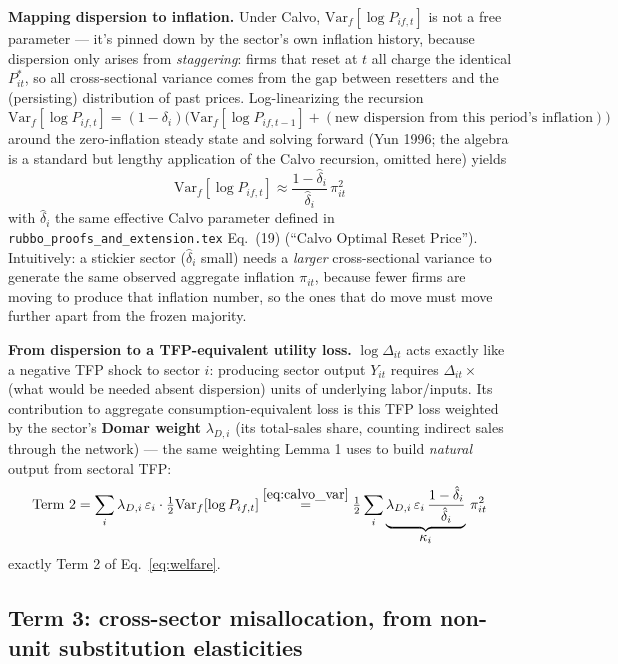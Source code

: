 \documentclass[12pt]{article}
\begin{document}
\textbf{Mapping dispersion to inflation.} Under Calvo, $\mathrm{Var}_f[\log P_{if,t}]$ is not a free
parameter — it's pinned down by the sector's own inflation history, because dispersion only arises
from \emph{staggering}: firms that reset at $t$ all charge the identical $P_{it}^*$, so all
cross-sectional variance comes from the gap between resetters and the (persisting) distribution of
past prices. Log-linearizing the recursion $\mathrm{Var}_f[\log P_{if,t}] = (1-\delta_i)\big(\mathrm{Var}_f[\log P_{if,t-1}] + (\text{new dispersion from this period's inflation})\big)$
around the zero-inflation steady state and solving forward (Yun 1996; the algebra is a standard but
lengthy application of the Calvo recursion, omitted here) yields
\begin{equation}
    \mathrm{Var}_f[\log P_{if,t}] \approx \frac{1-\hat\delta_i}{\hat\delta_i}\,\pi_{it}^2
    \label{eq:calvo_var}
\end{equation}
with $\hat\delta_i$ the same effective Calvo parameter defined in
\texttt{rubbo\_proofs\_and\_extension.tex} Eq.~(19) (``Calvo Optimal Reset Price''). Intuitively: a stickier sector ($\hat\delta_i$ small) needs a \emph{larger} cross-sectional
variance to generate the same observed aggregate inflation $\pi_{it}$, because fewer firms are
moving to produce that inflation number, so the ones that do move must move further apart from the
frozen majority.

\textbf{From dispersion to a TFP-equivalent utility loss.} $\log\Delta_{it}$ acts exactly like a
negative TFP shock to sector $i$: producing sector output $Y_{it}$ requires
$\Delta_{it}\times$(what would be needed absent dispersion) units of underlying labor/inputs. Its
contribution to aggregate consumption-equivalent loss is this TFP loss weighted by the sector's
\textbf{Domar weight} $\lambda_{D,i}$ (its total-sales share, counting indirect sales through the
network) — the same weighting Lemma 1 uses to build \emph{natural} output from sectoral TFP:
\begin{equation}
    \text{Term 2} = \sum_i \lambda_{D,i}\,\varepsilon_i \cdot \tfrac{1}{2}\mathrm{Var}_f[\log P_{if,t}]
    \overset{\eqref{eq:calvo_var}}{=} \tfrac12\sum_i \underbrace{\lambda_{D,i}\,\varepsilon_i\,\frac{1-\hat\delta_i}{\hat\delta_i}}_{\displaystyle \kappa_i}\,\pi_{it}^2
\end{equation}
exactly Term 2 of Eq.~\eqref{eq:welfare}.

\subsection{Term 3: cross-sector misallocation, from non-unit substitution elasticities}
\end{document}
